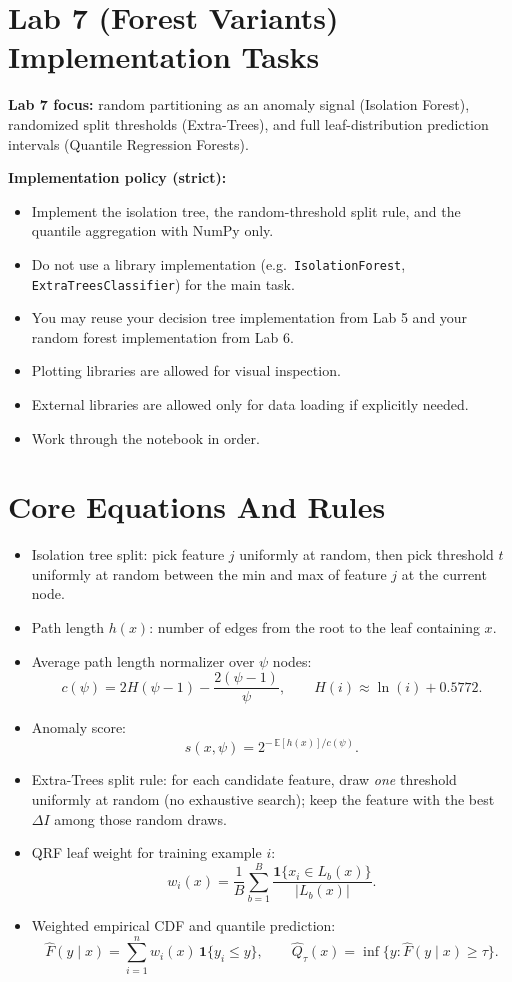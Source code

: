 \section*{Lab 7 (Forest Variants) Implementation Tasks}
\textbf{Lab 7 focus:} random partitioning as an anomaly signal (Isolation Forest), randomized split thresholds (Extra-Trees), and full leaf-distribution prediction intervals (Quantile Regression Forests).

\medskip
\textbf{Implementation policy (strict):}
\begin{itemize}
  \item Implement the isolation tree, the random-threshold split rule, and the quantile aggregation with NumPy only.
  \item Do not use a library implementation (e.g.\ \texttt{IsolationForest}, \texttt{ExtraTreesClassifier}) for the main task.
  \item You may reuse your decision tree implementation from Lab 5 and your random forest implementation from Lab 6.
  \item Plotting libraries are allowed for visual inspection.
  \item External libraries are allowed only for data loading if explicitly needed.
  \item Work through the notebook in order.
\end{itemize}

\section*{Core Equations And Rules}
\begin{itemize}
  \item Isolation tree split: pick feature $j$ uniformly at random, then pick threshold $t$ uniformly at random between the min and max of feature $j$ at the current node.
  \item Path length $h(x)$: number of edges from the root to the leaf containing $x$.
  \item Average path length normalizer over $\psi$ nodes:
  \[
    c(\psi) = 2H(\psi-1) - \frac{2(\psi-1)}{\psi},
    \qquad H(i) \approx \ln(i) + 0.5772.
  \]
  \item Anomaly score:
  \[
    s(x,\psi) = 2^{-\,\mathbb{E}[h(x)]/c(\psi)}.
  \]
  \item Extra-Trees split rule: for each candidate feature, draw \emph{one} threshold uniformly at random (no exhaustive search); keep the feature with the best $\Delta I$ among those random draws.
  \item QRF leaf weight for training example $i$:
  \[
    w_i(x) = \frac{1}{B}\sum_{b=1}^{B}
    \frac{\mathbf{1}\{x_i \in L_b(x)\}}{\bigl|L_b(x)\bigr|}.
  \]
  \item Weighted empirical CDF and quantile prediction:
  \[
    \hat{F}(y\mid x) = \sum_{i=1}^{n} w_i(x)\,\mathbf{1}\{y_i \le y\},
    \qquad
    \hat{Q}_\tau(x) = \inf\{y : \hat{F}(y\mid x) \ge \tau\}.
  \]
\end{itemize}

